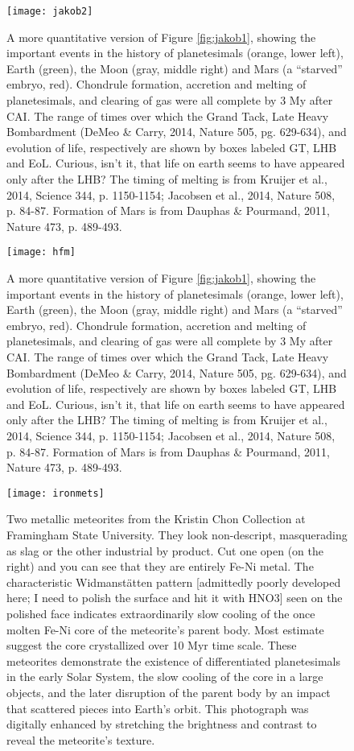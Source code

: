 \begin{figure}[p]
\centering
\texttt{[image: jakob2]}%
\caption{A more quantitative version of Figure \ref{fig:jakob1}, showing the important events in the history of planetesimals (orange, lower left), Earth (green), the Moon (gray, middle right) and Mars (a ``starved'' embryo, red). Chondrule formation, accretion and melting of planetesimals, and clearing of gas were all complete by 3 My after CAI. The range of times over which the Grand Tack, Late Heavy Bombardment (DeMeo \& Carry, 2014, Nature 505, pg. 629-634), and evolution of life, respectively are shown by boxes labeled GT, LHB and EoL. Curious, isn't it, that life on earth seems to have appeared only after the LHB? The timing of melting is from Kruijer et al., 2014, Science 344, p. 1150-1154; Jacobsen et al., 2014, Nature 508, p. 84-87. Formation of Mars is from Dauphas \& Pourmand, 2011, Nature 473, p. 489-493.}   
\label{fig:jakob2}
\end{figure}


\begin{figure}[p]
\centering
\texttt{[image: hfm]}%
\caption{A more quantitative version of Figure \ref{fig:jakob1}, showing the important events in the history of planetesimals (orange, lower left), Earth (green), the Moon (gray, middle right) and Mars (a ``starved'' embryo, red). Chondrule formation, accretion and melting of planetesimals, and clearing of gas were all complete by 3 My after CAI. The range of times over which the Grand Tack, Late Heavy Bombardment (DeMeo \& Carry, 2014, Nature 505, pg. 629-634), and evolution of life, respectively are shown by boxes labeled GT, LHB and EoL. Curious, isn't it, that life on earth seems to have appeared only after the LHB? The timing of melting is from Kruijer et al., 2014, Science 344, p. 1150-1154; Jacobsen et al., 2014, Nature 508, p. 84-87. Formation of Mars is from Dauphas \& Pourmand, 2011, Nature 473, p. 489-493.}   
\label{fig:hfm}
\end{figure}


\begin{figure}[p]
\centering
\texttt{[image: ironmets]}%
\caption{Two metallic meteorites from the Kristin Chon Collection at Framingham State University. They look non-descript, masquerading as slag or the other industrial by product. Cut one open (on the right) and you can see that they are entirely Fe-Ni metal. The characteristic Widmanst\"atten pattern [admittedly poorly developed here; I need to polish the surface and hit it with HNO3] seen on the polished face indicates extraordinarily slow cooling of the once molten Fe-Ni core of the meteorite's parent body. Most estimate suggest the core crystallized over 10 Myr time scale. These meteorites demonstrate the existence of differentiated planetesimals in the early Solar System, the slow cooling of the core in a large objects, and the later disruption of the parent body by an impact that scattered pieces into Earth's orbit. This photograph was digitally enhanced by stretching the brightness and contrast to reveal the meteorite's texture.}   
\label{fig:ironmets}
\end{figure}

